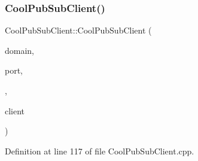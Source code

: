 \subsubsection{\texorpdfstring{Cool\+Pub\+Sub\+Client()}{CoolPubSubClient()}\hspace{0.1cm}{\footnotesize\ttfamily [13/14]}}
{\footnotesize\ttfamily Cool\+Pub\+Sub\+Client\+::\+Cool\+Pub\+Sub\+Client (\begin{DoxyParamCaption}\item[{const char $\ast$}]{domain,  }\item[{uint16\+\_\+t}]{port,  }\item[{\hyperlink{class_cool_pub_sub_client_a021ec75e9fbaf658370b8005ccfddc14}{M\+Q\+T\+T\+\_\+\+C\+A\+L\+L\+B\+A\+C\+K\+\_\+\+S\+I\+G\+N\+A\+T\+U\+RE}}]{,  }\item[{Client \&}]{client }\end{DoxyParamCaption})}



Definition at line 117 of file Cool\+Pub\+Sub\+Client.\+cpp.


